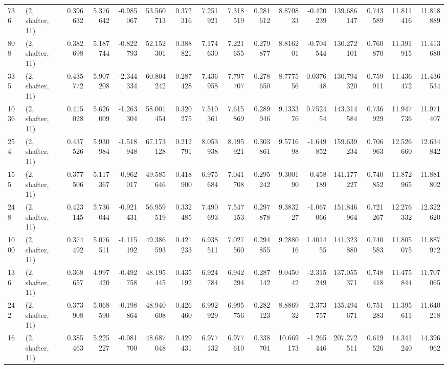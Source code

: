 \begin{tabular}{llrrrrrrrrrrrrrr}
736  &  (2, shafter, 11) &   0.396632 &   5.376642 &  -0.985067 &     53.560713 &    0.372316 &    7.251921 &    7.318519 &  0.281612 &   8.870833 &  -0.420239 &   139.686147 &   0.743589 &  11.811416 &  11.818889 \\
808  &  (2, shafter, 11) &   0.382698 &   5.187744 &  -0.822793 &     52.152301 &    0.388821 &    7.174630 &    7.221655 &  0.279877 &   8.816201 &  -0.704544 &   130.272101 &   0.760870 &  11.391915 &  11.413680 \\
335  &  (2, shafter, 11) &   0.435772 &   5.907208 &  -2.344334 &     60.804242 &    0.287428 &    7.436958 &    7.797707 &  0.278650 &   8.777556 &   0.037648 &   130.794320 &   0.759911 &  11.436472 &  11.436534 \\
1036 &  (2, shafter, 11) &   0.415028 &   5.626009 &  -1.263304 &     58.001454 &    0.320275 &    7.510361 &    7.615869 &  0.289946 &   9.133376 &   0.752454 &   143.314584 &   0.736929 &  11.947736 &  11.971407 \\
254  &  (2, shafter, 11) &   0.437526 &   5.930984 &  -1.518948 &     67.173128 &    0.212791 &    8.053938 &    8.195921 &  0.303861 &   9.571698 &  -1.649852 &   159.639234 &   0.706963 &  12.526660 &  12.634842 \\
155  &  (2, shafter, 11) &   0.377506 &   5.117367 &  -0.962017 &     49.585646 &    0.418900 &    6.975684 &    7.041708 &  0.295242 &   9.300190 &  -0.458189 &   141.177227 &   0.740852 &  11.872965 &  11.881802 \\
248  &  (2, shafter, 11) &   0.423145 &   5.736044 &  -0.921431 &     56.959519 &    0.332485 &    7.490693 &    7.547153 &  0.297878 &   9.383227 &  -1.067066 &   151.846964 &   0.721267 &  12.276332 &  12.322620 \\
1000 &  (2, shafter, 11) &   0.374492 &   5.076511 &  -1.115192 &     49.386593 &    0.421233 &    6.938511 &    7.027560 &  0.294855 &   9.288016 &   1.401455 &   141.323880 &   0.740583 &  11.805075 &  11.887972 \\
136  &  (2, shafter, 11) &   0.368657 &   4.997420 &  -0.492758 &     48.195445 &    0.435192 &    6.924784 &    6.942294 &  0.287142 &   9.045042 &  -2.315249 &   137.055371 &   0.748418 &  11.475844 &  11.707065 \\
242  &  (2, shafter, 11) &   0.373908 &   5.068590 &  -0.198864 &     48.940608 &    0.426460 &    6.992929 &    6.995756 &  0.282123 &   8.886932 &  -2.373757 &   135.494671 &   0.751283 &  11.395611 &  11.640218 \\
16   &  (2, shafter, 11) &   0.385463 &   5.225227 &  -0.081700 &     48.687048 &    0.429431 &    6.977132 &    6.977610 &  0.338701 &  10.669173 &  -1.265446 &   207.272511 &   0.619526 &  14.341240 &  14.396962 \\

\end{tabular}
